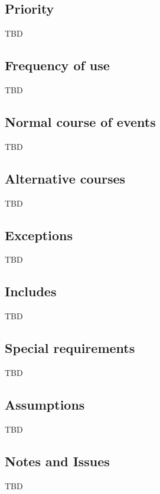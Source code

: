 \documentclass[a4paper]{article}
\begin{document}
\subsection{Priority}
TBD
\subsection{Frequency of use}
TBD
\subsection{Normal course of events}
TBD
\subsection{Alternative courses}
TBD
\subsection{Exceptions}
TBD
\subsection{Includes}
TBD
\subsection{Special requirements}
TBD
\subsection{Assumptions}
TBD
\subsection{Notes and Issues}
TBD
\end{document}
